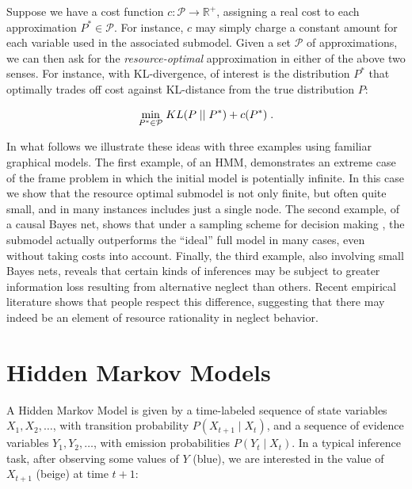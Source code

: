 \documentclass[10pt,letterpaper]{article}
\begin{document}
Suppose we have a cost function $c: \mathcal{P}\rightarrow\mathbb{R}^+$, assigning a real cost to each approximation $P^* \in \mathcal{P}$. For instance, $c$ may simply charge a constant amount for each variable used in the associated submodel. Given a set $\mathcal{P}$ of approximations, we can then ask for the \emph{resource-optimal} approximation  in either of the above two senses. For instance, with KL-divergence, of interest is the distribution $P^*$ that optimally trades off cost against KL-distance from the true distribution $P$: 

\begin{equation} \underset{P^*\in\mathcal{P}}{\textnormal{min}} \; KL(P\;||\;P^*) + c(P^*)\;.\label{optimal}\end{equation}


In what follows we illustrate these ideas with three examples using familiar graphical models. The first example, of an HMM, demonstrates an extreme case of the frame problem in which the initial model is potentially infinite. In this case we show that the resource optimal submodel is not only finite, but often quite small, and in many instances includes just a single node. The second example, of a causal Bayes net, shows that under a sampling scheme for decision making \citep{Vul2014}, the submodel actually outperforms the ``ideal'' full model in many cases, even without taking costs into account. Finally, the third example, also involving small Bayes nets, reveals that certain kinds of inferences may be subject to greater information loss resulting from alternative neglect than others. Recent empirical literature shows that people respect this difference, suggesting that there may indeed be an element of resource rationality in neglect behavior.

\section{Hidden Markov Models}

A Hidden Markov Model is given by a time-labeled sequence of state variables $X_1,X_2,\dots$, with transition probability $P(X_{t+1}\mid X_t)$, and a sequence of evidence variables $Y_1,Y_2,\dots$, with emission probabilities $P(Y_t\mid X_t)$. In a typical inference task, after observing some values of $Y$ (blue), we are interested in the value of $X_{t+1}$ (beige) at time $t+1$:
\end{document}
